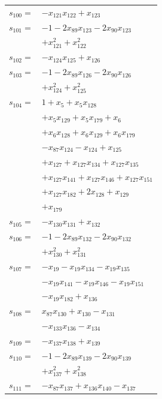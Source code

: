 \begin{longtable}{@{}r@{\;}l@{}}
\(s_{100}=\) & \(\displaystyle -x_{121}x_{122} +x_{123}\) \\[3pt]
\(s_{101}=\) & \(\displaystyle -1 -2x_{89}x_{123} -2x_{90}x_{123}\) \\
 & \(\displaystyle +x_{121}^{2} +x_{122}^{2}\) \\[3pt]
\(s_{102}=\) & \(\displaystyle -x_{124}x_{125} +x_{126}\) \\[3pt]
\(s_{103}=\) & \(\displaystyle -1 -2x_{89}x_{126} -2x_{90}x_{126}\) \\
 & \(\displaystyle +x_{124}^{2} +x_{125}^{2}\) \\[3pt]
\(s_{104}=\) & \(\displaystyle 1 +x_{5} +x_{5}x_{128}\) \\
 & \(\displaystyle +x_{5}x_{129} +x_{5}x_{179} +x_{6}\) \\
 & \(\displaystyle +x_{6}x_{128} +x_{6}x_{129} +x_{6}x_{179}\) \\
 & \(\displaystyle -x_{87}x_{124} -x_{124} +x_{125}\) \\
 & \(\displaystyle +x_{127} +x_{127}x_{134} +x_{127}x_{135}\) \\
 & \(\displaystyle +x_{127}x_{141} +x_{127}x_{146} +x_{127}x_{151}\) \\
 & \(\displaystyle +x_{127}x_{182} +2x_{128} +x_{129}\) \\
 & \(\displaystyle +x_{179}\) \\[3pt]
\(s_{105}=\) & \(\displaystyle -x_{130}x_{131} +x_{132}\) \\[3pt]
\(s_{106}=\) & \(\displaystyle -1 -2x_{89}x_{132} -2x_{90}x_{132}\) \\
 & \(\displaystyle +x_{130}^{2} +x_{131}^{2}\) \\[3pt]
\(s_{107}=\) & \(\displaystyle -x_{19} -x_{19}x_{134} -x_{19}x_{135}\) \\
 & \(\displaystyle -x_{19}x_{141} -x_{19}x_{146} -x_{19}x_{151}\) \\
 & \(\displaystyle -x_{19}x_{182} +x_{136}\) \\[3pt]
\(s_{108}=\) & \(\displaystyle x_{87}x_{130} +x_{130} -x_{131}\) \\
 & \(\displaystyle -x_{133}x_{136} -x_{134}\) \\[3pt]
\(s_{109}=\) & \(\displaystyle -x_{137}x_{138} +x_{139}\) \\[3pt]
\(s_{110}=\) & \(\displaystyle -1 -2x_{89}x_{139} -2x_{90}x_{139}\) \\
 & \(\displaystyle +x_{137}^{2} +x_{138}^{2}\) \\[3pt]
\(s_{111}=\) & \(\displaystyle -x_{87}x_{137} +x_{136}x_{140} -x_{137}\) \\

\end{longtable}
